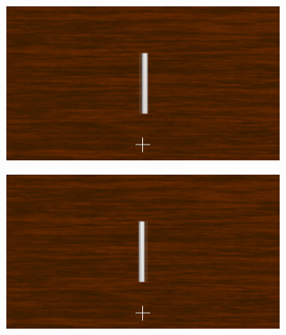 \begin{figure}[htbp]
    \begin{subfigure}[b]{0.5\textwidth}
        \includegraphics[width=\textwidth]{./Template_Figures/stereo_ghost_left}
        \caption{}\label{fig:obs_st_left}
    \end{subfigure}
    \begin{subfigure}[b]{0.5\textwidth}
        \includegraphics[width=\textwidth]{./Template_Figures/stereo_ghost_right}
        \caption{}\label{fig:obs_st_right}
    \end{subfigure}


\end{figure}
